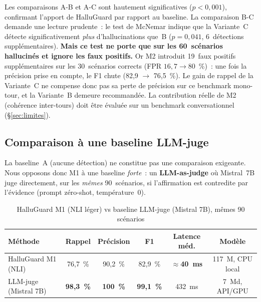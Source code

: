 \documentclass[12pt,a4paper]{article}
\begin{document}
Les comparaisons A-B et A-C sont hautement significatives ($p<0{,}001$), confirmant l'apport de HalluGuard par rapport au baseline. La comparaison B-C demande une lecture prudente~: le test de McNemar indique que la Variante~C détecte significativement \emph{plus} d'hallucinations que~B ($p=0{,}041$, 6~détections supplémentaires). \textbf{Mais ce test ne porte que sur les 60~scénarios hallucinés et ignore les faux positifs.} Or M2 introduit 19~faux positifs supplémentaires sur les 30~scénarios corrects (FPR $16{,}7 \to 80$~\%)~: une fois la précision prise en compte, le F1 chute (82,9 $\to$ 76,5~\%). Le gain de rappel de la Variante~C ne compense donc pas sa perte de précision sur ce benchmark mono-tour, et la Variante~B demeure recommandée. La contribution réelle de M2 (cohérence inter-tours) doit être évaluée sur un benchmark conversationnel (§\ref{sec:limites}).

\subsection{Comparaison à une baseline LLM-juge}
\label{sec:baseline_judge}

La baseline~A (aucune détection) ne constitue pas une comparaison exigeante. Nous opposons donc M1 à une baseline \emph{forte}~: un \textbf{LLM-as-judge} où Mistral~7B juge directement, sur les \emph{mêmes} 90~scénarios, si l'affirmation est contredite par l'évidence (prompt zéro-shot, température~0).

\begin{table}[H]
\centering
\caption{HalluGuard M1 (NLI léger) vs baseline LLM-juge (Mistral 7B), mêmes 90 scénarios}
\label{tab:baseline_judge}
\renewcommand{\arraystretch}{1.25}
\begin{tabular}{lccccc}
\toprule
\textbf{Méthode} & \textbf{Rappel} & \textbf{Précision} & \textbf{F1} & \textbf{Latence méd.} & \textbf{Modèle} \\
\midrule
\rowcolor{highlight}
HalluGuard M1 (NLI) & 76,7~\% & 90,2~\% & 82,9~\% & \textbf{$\approx$40~ms} & 117~M, CPU local \\
LLM-juge (Mistral 7B) & \textbf{98,3~\%} & \textbf{100~\%} & \textbf{99,1~\%} & 432~ms & 7~Md, API/GPU \\
\bottomrule
\end{tabular}
\end{table}
\end{document}
